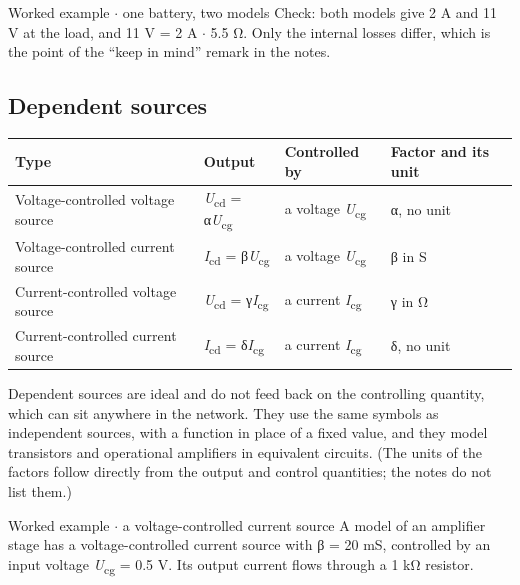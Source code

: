\documentclass[11pt]{article}
\begin{document}
\begin{keepsection}
\begin{keepsection}
\begin{workedbox}{Worked example \ensuremath{\cdot} one battery, two models}
Check: both models give 2 A and 11 V at the load, and 11 V = 2 A \ensuremath{\cdot} 5.5 Ω. Only the internal losses differ, which is the point of the “keep in mind” remark in the notes.
\end{workedbox}
\end{keepsection}

\begin{keepsection}
\subsection{Dependent sources}

\begin{center}\small\begin{tabularx}{\linewidth}{>{\raggedright\arraybackslash}X>{\raggedright\arraybackslash}X>{\raggedright\arraybackslash}X>{\raggedright\arraybackslash}X}\toprule
\textbf{Type} & \textbf{Output} & \textbf{Controlled by} & \textbf{Factor and its unit} \\ \midrule
Voltage-controlled voltage source & \textit{U}\textsubscript{cd} = α\textit{U}\textsubscript{cg} & a voltage \textit{U}\textsubscript{cg} & α, no unit \\
Voltage-controlled current source & \textit{I}\textsubscript{cd} = β\textit{U}\textsubscript{cg} & a voltage \textit{U}\textsubscript{cg} & β in S \\
Current-controlled voltage source & \textit{U}\textsubscript{cd} = γ\textit{I}\textsubscript{cg} & a current \textit{I}\textsubscript{cg} & γ in Ω \\
Current-controlled current source & \textit{I}\textsubscript{cd} = δ\textit{I}\textsubscript{cg} & a current \textit{I}\textsubscript{cg} & δ, no unit \\
\bottomrule\end{tabularx}\end{center}

Dependent sources are ideal and do not feed back on the controlling quantity, which can sit anywhere in the network. They use the same symbols as independent sources, with a function in place of a fixed value, and they model transistors and operational amplifiers in equivalent circuits. (The units of the factors follow directly from the output and control quantities; the notes do not list them.)

\begin{workedbox}{Worked example \ensuremath{\cdot} a voltage-controlled current source}
A model of an amplifier stage has a voltage-controlled current source with β = 20 mS, controlled by an input voltage \textit{U}\textsubscript{cg} = 0.5 V. Its output current flows through a 1 kΩ resistor.


\end{workedbox}
\end{keepsection}
\end{keepsection}
\end{document}
